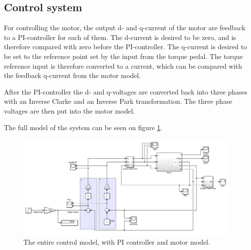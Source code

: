 

\subsection{Control system}
\label{sec:control_system}

For controlling the motor, the output d- and q-current of the motor are feedback to a PI-controller for each of them. The d-current is desired to be zero, and is therefore compared with zero before the PI-controller. The q-current is desired to be set to the reference point set by the input from the torque pedal. The torque reference input is therefore converted to a current, which can be compared with the feedback q-current from the motor model.

After the PI-controller the d- and q-voltages are converted back into three phases with an Inverse Clarke and an Inverse Park transformation. The three phase voltages are then put into the motor model.

The full model of the system can be seen on figure \ref{fig:control_system}.


\begin{figure}[H]
	\centering
	\includegraphics[width=1\linewidth]{pictures/control/full_model.PNG}
	\caption{The entire control model, with PI controller and motor model.}
	\label{fig:control_system}
\end{figure}

